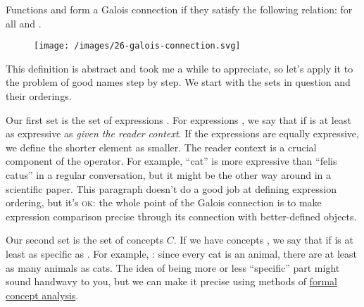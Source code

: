 \documentclass{article}
\begin{document}
Functions
and
form a Galois connection if they satisfy the following relation:
for all
and
.

\begin{figure}[grayscale-diagram,medium-size]
  \texttt{[image: /images/26-galois-connection.svg]}
\end{figure}

This definition is abstract and took me a while to appreciate,
so let's apply it to the problem of good names step by step.
We start with the sets in question and their orderings.

Our first set is the set of expressions .
For expressions
,
we say that
if  is at least as expressive as
 \emph{given the reader context}.
If the expressions are equally expressive, we define the shorter element as smaller.
The reader context is a crucial component of the \mathml{\mo{\leq}} operator.
For example, ``cat'' is more expressive than ``felis catus'' in a regular conversation,
but it might be the other way around in a scientific paper.
This paragraph doesn't do a good job at defining expression ordering,
but it's \textsc{ok}:
the whole point of the Galois connection is to make expression comparison precise through its connection with better-defined objects.

Our second set is the set of concepts $C$.
If we have concepts
,
we say that
if 
is at least as specific as .
For example, :
since every cat is an animal,
there are at least as many animals as cats.
The idea of being more or less ``specific'' part might sound handwavy to you,
but we can make it precise using methods of \href{https://en.wikipedia.org/wiki/Formal_concept_analysis}{formal concept analysis}.
\end{document}
